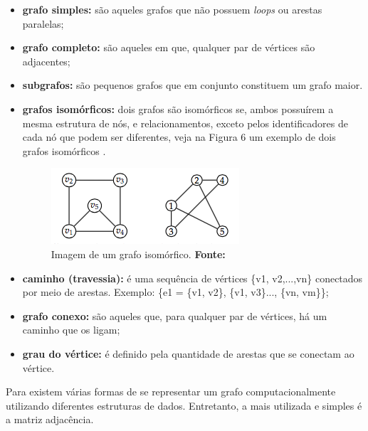 \begin{itemize}
	\item \textbf{grafo simples:} são aqueles grafos que não possuem \textit{loops} ou arestas paralelas;
	
	\item \textbf{grafo completo:} são aqueles em que, qualquer par de vértices são adjacentes;
	
	\item \textbf{subgrafos:} são pequenos grafos que em conjunto constituem um grafo maior.
	
	\item \textbf{grafos isomórficos:} dois grafos são isomórficos se, ambos possuírem a mesma estrutura de nós, e relacionamentos, exceto pelos identificadores de cada nó que podem ser diferentes, veja na Figura 6 um exemplo de dois grafos isomórficos \cite{harju_graph_theory}.
	
	\begin{figure}[h!]
		\centerline{\includegraphics[scale=1]{./imagens/grafos_isomorficos.png}}
		\caption[Imagem de um grafo isomórfico]
		{Imagem de um grafo isomórfico. \textbf{Fonte:} }
		\label{fig:exemplo1}
	\end{figure}
	
	\item \textbf{caminho (travessia):} é uma sequência de vértices \{v1, v2,...,vn\} conectados por meio de arestas. Exemplo: \{e1 = \{v1, v2\}, \{v1, v3\}..., \{vn, vm\}\};

	\item \textbf{grafo conexo:} são aqueles que, para qualquer par de vértices, há um caminho que os ligam;
	
	\item \textbf{grau do vértice:} é definido pela quantidade de arestas que se conectam ao vértice.
	
\end{itemize}

Para  existem várias formas de se representar um grafo computacionalmente utilizando diferentes estruturas de dados. Entretanto, a mais utilizada e simples é a matriz adjacência.

